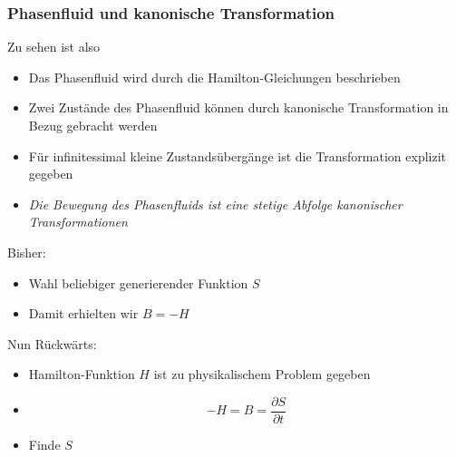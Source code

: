 \begin{frame}
    \frametitle{Phasenfluid und kanonische Transformation}
    Zu sehen ist also
    \begin{itemize}
        \item Das Phasenfluid wird durch die Hamilton-Gleichungen beschrieben
        \item Zwei Zustände des Phasenfluid können durch kanonische Transformation in Bezug gebracht werden
        \item Für infinitessimal kleine Zustandsübergänge ist die Transformation explizit gegeben
        \item \emph{Die Bewegung des Phasenfluids ist eine stetige Abfolge kanonischer Transformationen}
    \end{itemize}
    
\end{frame}

\begin{frame}
    Bisher:
    \begin{itemize}
        \item Wahl beliebiger generierender Funktion $S$
        \item Damit erhielten wir $B = -H$
    \end{itemize}
    \vspace{1cm}
    Nun Rückwärts:
    \begin{itemize}
        \item Hamilton-Funktion $H$ ist zu physikalischem Problem gegeben
        \item \begin{displaymath} -H = B = \frac{\partial S}{\partial t} \end{displaymath}
        \item Finde $S$
    \end{itemize}
    
\end{frame}